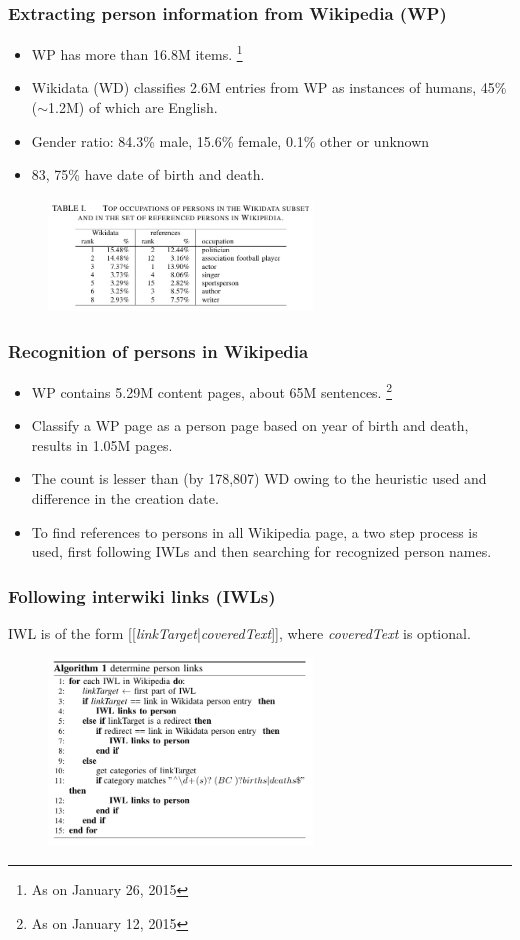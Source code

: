 \documentclass[10pt, compress]{beamer}
\begin{document}
\begin{frame}[fragile]
	\frametitle{Extracting person information from Wikipedia (WP)}
\begin{itemize}
\item WP has more than 16.8M items. \footnote{As on January 26, 2015}
\item Wikidata (WD) classifies 2.6M entries from WP as instances of humans, 45\% ($\sim$1.2M) of which are English.
\item Gender ratio: 84.3\% male, 15.6\% female, 0.1\% other or unknown 
\item 83, 75\% have date of birth and death.
\end{itemize}
\begin{figure}
  \centering
 \includegraphics[width=7cm,height=3cm]{Table1.png}
\end{figure}
\end{frame}

\begin{frame}[fragile]
	\frametitle{Recognition of persons in Wikipedia}
\begin{itemize}
\item WP contains 5.29M content pages, about 65M sentences. \footnote{As on January 12, 2015}
\item Classify a WP page as a person page based on year of birth and death, results in 1.05M pages.
\item The count is lesser than (by 178,807) WD owing to the heuristic used and difference in the creation date.
\item To find references to persons in all Wikipedia page, a two step process is used, first following IWLs and then searching for 	recognized person names.
\end{itemize}
\end{frame}

\begin{frame}[fragile]
	\frametitle{Following interwiki links (IWLs)}
IWL is of the form [[\textit{linkTarget}|\textit{coveredText}]], where \textit{coveredText} is optional.
\begin{figure}
  \centering
 \includegraphics[width=7cm,height=5cm]{Algo1.png}
\end{figure}
\end{frame}
\end{document}
